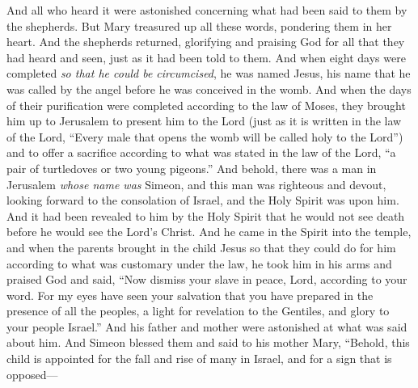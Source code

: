 \begin{biblechapter}
\verse And all who heard it were astonished concerning what had been said to them by the shepherds.
\verse But Mary treasured up all these words, pondering them in her heart.
\verse And the shepherds returned, glorifying and praising God for all that they had heard and seen, just as it had been told to them.
\verse And when eight days were completed \textit{so that he could be circumcised}, he was named Jesus, his name that he was called by the angel before he was conceived in the womb.
 And when the days of their purification were completed according to the law of Moses, they brought him up to Jerusalem to present him to the Lord
\verse (just as it is written in the law of the Lord, “Every male that opens the womb will be called holy to the Lord”)
\verse and to offer a sacrifice according to what was stated in the law of the Lord, “a pair of turtledoves or two young pigeons.”
 And behold, there was a man in Jerusalem \textit{whose name was} Simeon, and this man was righteous and devout, looking forward to the consolation of Israel, and the Holy Spirit was upon him.
\verse And it had been revealed to him by the Holy Spirit that he would not see death before he would see the Lord’s Christ.
\verse And he came in the Spirit into the temple, and when the parents brought in the child Jesus so that they could do for him according to what was customary under the law,
\verse he took him in his arms and praised God and said,
\verse “Now dismiss your slave in peace, Lord, 
according to your word.
\verse For my eyes have seen your salvation
\verse that you have prepared in the presence of all the peoples,
\verse a light for revelation to the Gentiles, 
and glory to your people Israel.”
\verse And his father and mother were astonished at what was said about him.
\verse And Simeon blessed them and said to his mother Mary, “Behold, this child is appointed for the fall and rise of many in Israel, and for a sign that is opposed—

\end{biblechapter}
